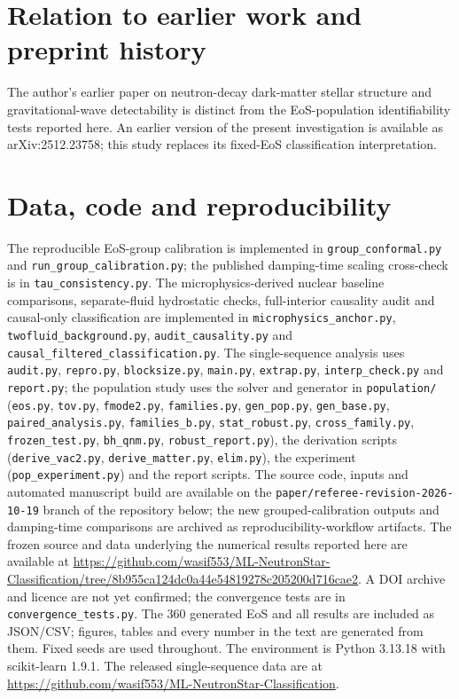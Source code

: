 \documentclass[11pt,a4paper]{article}
\begin{document}
\section*{Relation to earlier work and preprint history}
The author's earlier paper on neutron-decay dark-matter stellar structure and gravitational-wave detectability \citep{HusainOsc} is distinct from the EoS-population identifiability tests reported here. An earlier version of the present investigation is available as arXiv:2512.23758; this study replaces its fixed-EoS classification interpretation.

\section*{Data, code and reproducibility}
The reproducible EoS-group calibration is implemented in \texttt{group\_conformal.py} and \texttt{run\_group\_calibration.py}; the published damping-time scaling cross-check is in \texttt{tau\_consistency.py}. The microphysics-derived nuclear baseline comparisons, separate-fluid hydrostatic checks, full-interior causality audit and causal-only classification are implemented in \texttt{microphysics\_anchor.py}, \texttt{twofluid\_background.py}, \texttt{audit\_causality.py} and \texttt{causal\_filtered\_classification.py}. The single-sequence analysis uses \texttt{audit.py}, \texttt{repro.py}, \texttt{blocksize.py}, \texttt{main.py}, \texttt{extrap.py}, \texttt{interp\_check.py} and \texttt{report.py}; the population study uses the solver and generator in \texttt{population/} (\texttt{eos.py}, \texttt{tov.py}, \texttt{fmode2.py}, \texttt{families.py}, \texttt{gen\_pop.py}, \texttt{gen\_base.py}, \texttt{paired\_analysis.py}, \texttt{families\_b.py}, \texttt{stat\_robust.py}, \texttt{cross\_family.py}, \texttt{frozen\_test.py}, \texttt{bh\_qnm.py}, \texttt{robust\_report.py}), the derivation scripts (\texttt{derive\_vac2.py}, \texttt{derive\_matter.py}, \texttt{elim.py}), the experiment (\texttt{pop\_experiment.py}) and the report scripts. The source code, inputs and automated manuscript build are available on the \texttt{paper/referee-revision-2026-10-19} branch of the repository below; the new grouped-calibration outputs and damping-time comparisons are archived as reproducibility-workflow artifacts. The frozen source and data underlying the numerical results reported here are available at \url{https://github.com/wasif553/ML-NeutronStar-Classification/tree/8b955ca124dc0a44e54819278c205200d716cae2}. A DOI archive and licence are not yet confirmed; the convergence tests are in \texttt{convergence\_tests.py}. The 360 generated EoS and all results are included as JSON/CSV; figures, tables and every number in the text are generated from them. Fixed seeds are used throughout. The environment is Python 3.13.18 with scikit-learn 1.9.1. The released single-sequence data are at \url{https://github.com/wasif553/ML-NeutronStar-Classification}.
\end{document}
